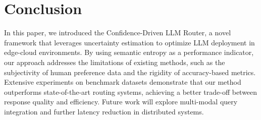 \section{Conclusion}
In this paper, we introduced the Confidence-Driven LLM Router, a novel framework that leverages uncertainty estimation to optimize LLM deployment in edge-cloud environments. 
%
By using semantic entropy as a performance indicator, our approach addresses the limitations of existing methods, such as the subjectivity of human preference data and the rigidity of accuracy-based metrics. 
%
Extensive experiments on benchmark datasets demonstrate that our method outperforms state-of-the-art routing systems, achieving a better trade-off between response quality and efficiency. Future work will explore multi-modal query integration and further latency reduction in distributed systems.